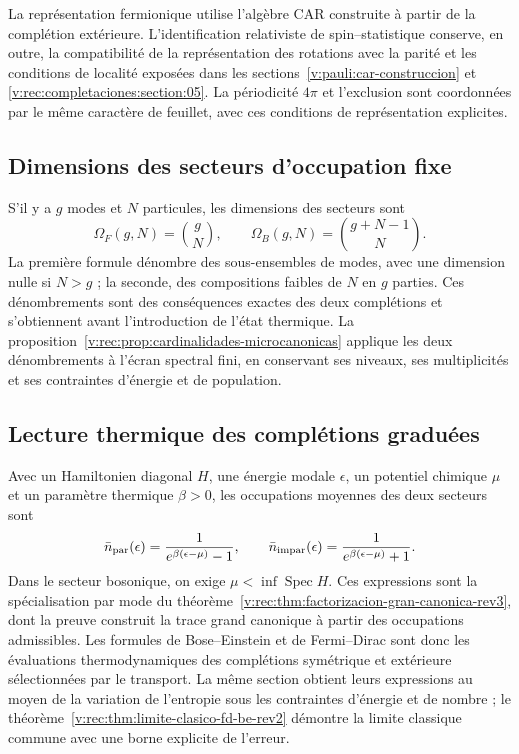 La représentation fermionique utilise l’algèbre CAR construite à partir de la
complétion extérieure. L’identification relativiste de
spin--statistique conserve, en outre, la compatibilité de la représentation
des rotations avec la parité et les conditions de localité exposées dans
les sections~\ref{v:pauli:car-construccion} et
\ref{v:rec:completaciones:section:05}. La périodicité \(4\pi\) et
l’exclusion sont coordonnées par le même caractère de feuillet, avec ces
conditions de représentation explicites.

\subsection{Dimensions des secteurs d’occupation fixe}
\label{v:rec:completaciones:section:07}

S’il y a \(g\) modes et \(N\) particules, les dimensions des secteurs sont
\begin{equation}
 \Omega_F(g,N)=\binom gN,
 \qquad
 \Omega_B(g,N)=\binom{g+N-1}{N}.
 \label{v:ocupacion:eq:dimensiones-sectores}
\end{equation}
La première formule dénombre des sous-ensembles de modes, avec une dimension nulle si
\(N>g\) ; la seconde, des compositions faibles de \(N\) en \(g\) parties.
Ces dénombrements sont des conséquences exactes des deux complétions et
s’obtiennent avant l’introduction de l’état thermique. La
proposition~\ref{v:rec:prop:cardinalidades-microcanonicas} applique les deux
dénombrements à l’écran spectral fini, en conservant ses niveaux,
ses multiplicités et ses contraintes d’énergie et de population.

\subsection{Lecture thermique des complétions graduées}
\label{v:ocupacion:lectura-termica}

Avec un Hamiltonien diagonal \(H\), une énergie modale \(\epsilon\), un potentiel
chimique \(\mu\) et un paramètre thermique \(\beta>0\), les occupations moyennes
des deux secteurs sont
\begin{equation}
 \bar n_{\rm par}(\epsilon)
 =\frac{1}{e^{\beta(\epsilon-\mu)}-1},
 \qquad
 \bar n_{\rm impar}(\epsilon)
 =\frac{1}{e^{\beta(\epsilon-\mu)}+1}.
 \label{v:ocupacion:eq:leyes-por-modo}
\end{equation}
Dans le secteur bosonique, on exige \(\mu<\inf\operatorname{Spec}H\).
Ces expressions sont la spécialisation par mode du
théorème~\ref{v:rec:thm:factorizacion-gran-canonica-rev3}, dont la preuve
construit la trace grand canonique à partir des occupations admissibles.
Les formules de Bose--Einstein et de Fermi--Dirac sont donc les
évaluations thermodynamiques des complétions symétrique et extérieure
sélectionnées par le transport. La même section obtient leurs expressions
au moyen de la variation de l’entropie sous les contraintes d’énergie et de
nombre ; le théorème~\ref{v:rec:thm:limite-clasico-fd-be-rev2} démontre la
limite classique commune avec une borne explicite de l’erreur.

